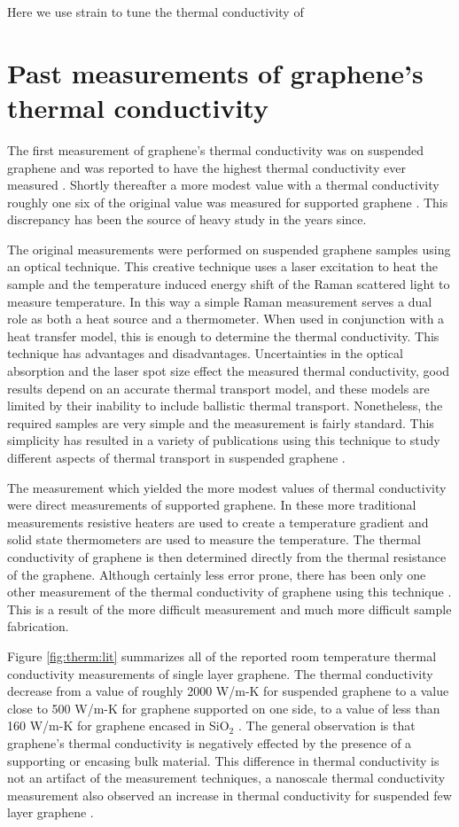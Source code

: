 Here we use strain to tune the thermal conductivity of  


\section{Past measurements of graphene's thermal conductivity}
The first measurement of graphene's thermal conductivity was on suspended graphene and was reported to have the highest thermal conductivity ever measured \cite{Balandin2008}.
Shortly thereafter a more modest value with a thermal conductivity roughly one six of the original value was measured for supported graphene \cite{Seol2010}.
This discrepancy has been the source of heavy study in the years since.

The original measurements were performed on suspended graphene samples using an optical technique.
This creative technique uses a laser excitation to heat the sample and the temperature induced energy shift of the Raman scattered light to measure temperature.
In this way a simple Raman measurement serves a dual role as both a heat source and a thermometer.
When used in conjunction with a heat transfer model, this is enough to determine the thermal conductivity.
This technique has advantages and disadvantages.
Uncertainties in the optical absorption and the laser spot size effect the measured thermal conductivity, good results depend on an accurate thermal transport model, and these models are limited by their inability to include ballistic thermal transport.
Nonetheless, the required samples are very simple and the measurement is fairly standard.
This simplicity has resulted in a variety of publications using this technique to study different aspects of thermal transport in suspended graphene \cite{Balandin2008,Faugeras2010,Cai2010,Ghosh2010,Lee2011,Chen2011a,Chen2012}.

The measurement which yielded the more modest values of thermal conductivity were direct measurements of supported graphene.
In these more traditional measurements resistive heaters are used to create a temperature gradient and solid state thermometers are used to measure the temperature.
The thermal conductivity of graphene is then determined directly from the thermal resistance of the graphene.
Although certainly less error prone, there has been only one other measurement of the thermal conductivity of graphene using this technique \cite{Jang2010}.
This is a result of the more difficult measurement and much more difficult sample fabrication.

Figure \ref{fig:therm:lit} summarizes all of the reported room temperature thermal conductivity measurements of single layer graphene.
The thermal conductivity decrease from a value of roughly 2000 W/m-K for suspended graphene to a value close to 500 W/m-K for graphene supported on one side, to a value of less than 160 W/m-K for graphene encased in SiO$_2$ \cite{Jang2010}.
The general observation is that graphene's thermal conductivity is negatively effected by the presence of a supporting or encasing bulk material.
This difference in thermal conductivity is not an artifact of the measurement techniques, a nanoscale thermal conductivity measurement also observed an increase in thermal conductivity for suspended few layer graphene \cite{Pumarol2012}.

